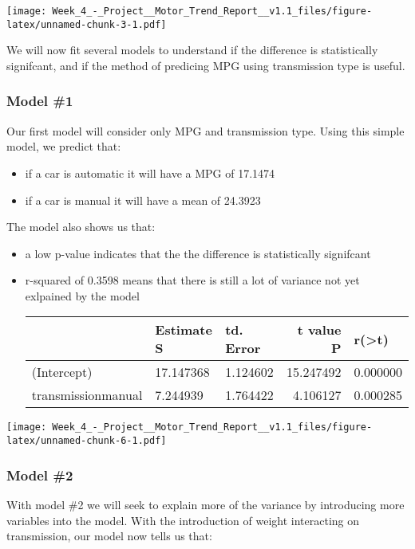 \documentclass[]{article}
\providecommand{\tightlist}{%
  \setlength{\itemsep}{0pt}\setlength{\parskip}{0pt}}
\begin{document}
\texttt{[image: Week\_4\_-\_Project\_\_Motor\_Trend\_Report\_\_v1.1\_files/figure-latex/unnamed-chunk-3-1.pdf]}

We will now fit several models to understand if the difference is
statistically signifcant, and if the method of predicing MPG using
transmission type is useful.

\hypertarget{model-1}{%
\subsubsection{Model \#1}\label{model-1}}

Our first model will consider only MPG and transmission type. Using this
simple model, we predict that:

\begin{itemize}
\tightlist
\item
  if a car is automatic it will have a MPG of 17.1474
\item
  if a car is manual it will have a mean of 24.3923
\end{itemize}

The model also shows us that:

\begin{itemize}
\item
  a low p-value indicates that the the difference is statistically
  signifcant
\item
  r-squared of 0.3598 means that there is still a lot of variance not
  yet exlpained by the model

  \begin{longtable}[]{@{}lllrl@{}}
  \toprule
  & Estimate S & td. Error & t value P &
  r(\textgreater{}\textbar{}t\textbar{})\tabularnewline
  \midrule
  \endhead
  (Intercept) & 17.147368 & 1.124602 & 15.247492 &
  0.000000\tabularnewline
  transmissionmanual & 7.244939 & 1.764422 & 4.106127 &
  0.000285\tabularnewline
  \bottomrule
  \end{longtable}
\end{itemize}

\texttt{[image: Week\_4\_-\_Project\_\_Motor\_Trend\_Report\_\_v1.1\_files/figure-latex/unnamed-chunk-6-1.pdf]}

\hypertarget{model-2}{%
\subsubsection{Model \#2}\label{model-2}}

With model \#2 we will seek to explain more of the variance by
introducing more variables into the model. With the introduction of
weight interacting on transmission, our model now tells us that:
\end{document}
